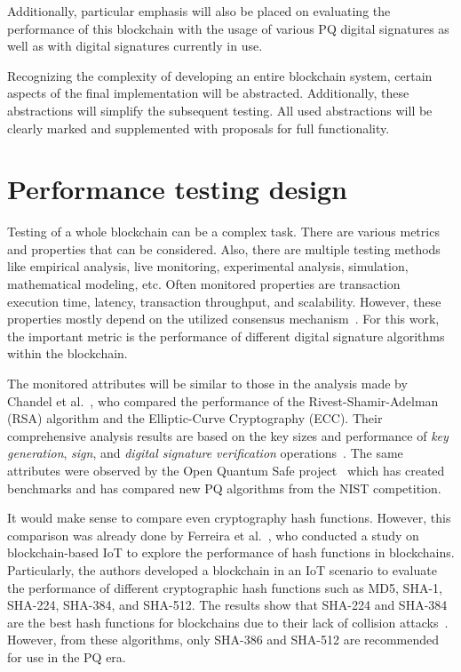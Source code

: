 Additionally, particular emphasis will also be placed on evaluating the performance of this blockchain with the usage of various PQ digital signatures as well as with digital signatures currently in use.

Recognizing the complexity of developing an entire blockchain system, certain aspects of the final implementation will be abstracted. Additionally, these abstractions will simplify the subsequent testing. All used abstractions will be clearly marked and supplemented with proposals for full functionality.


\section{Performance testing design}
\label{sec:design.testing}

Testing of a whole blockchain can be a complex task. There are various metrics and properties that can be considered. Also, there are multiple testing methods like empirical analysis, live monitoring, experimental analysis, simulation, mathematical modeling, etc. Often monitored properties are transaction execution time, latency, transaction throughput, and scalability. However, these properties mostly depend on the utilized consensus mechanism~\cite{BC.performance.eval}. For this work, the important metric is the performance of different digital signature algorithms within the blockchain.

The monitored attributes will be similar to those in the analysis made by Chandel et al.~\cite{analysis.of.RSA.ECC}, who compared the performance of the Rivest-Shamir-Adelman (RSA) algorithm and the Elliptic-Curve Cryptography (ECC). Their comprehensive analysis results are based on the key sizes and performance of \emph{key generation}, \emph{sign}, and \emph{digital signature verification} operations~\cite{BC.performance.eval}. The same attributes were observed by the Open Quantum Safe project~\cite{kem.signature.performance} which has created benchmarks and has compared new PQ algorithms from the NIST competition.

It would make sense to compare even cryptography hash functions. However, this comparison was already done by Ferreira et al.~\cite{hash.fun.performance}, who conducted a study on blockchain-based IoT to explore the performance of hash functions in blockchains. Particularly, the authors developed a blockchain in an IoT scenario to evaluate the performance of different cryptographic hash functions such as MD5, SHA-1, SHA-224, SHA-384, and SHA-512. The results show that SHA-224 and SHA-384 are the best hash functions for blockchains due to their lack of collision attacks~\cite{BC.performance.eval}. However, from these algorithms, only SHA-386 and SHA-512 are recommended for use in the PQ era.

